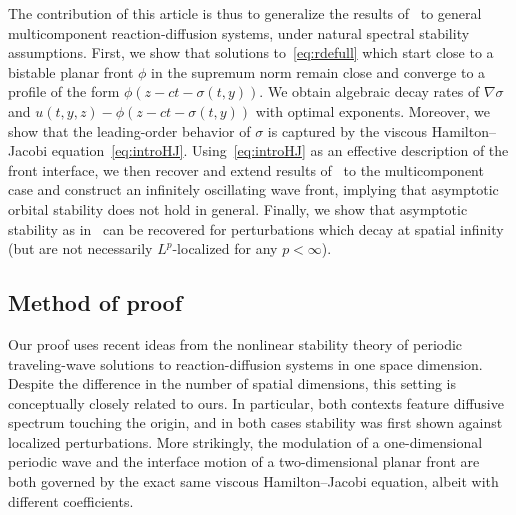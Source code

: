 \documentclass[12pt,oneside,a4paper,reqno]{amsart}
\numberwithin{equation}{section}
\theoremstyle{definition}
\theoremstyle{remark}
\begin{document}
The contribution of this article is thus to generalize the results of~\cite{matano_stability_2009,matano_large_2011,Roquejoffre_nontrivial_2009} to general multicomponent reaction-diffusion systems, under natural spectral stability assumptions. First, we show that solutions to~\eqref{eq:rdefull} which start close to a bistable planar front $\phi$ in the supremum norm remain close and converge to a profile of the form $\phi(z - ct - \sigma(t,y))$. We obtain algebraic decay rates of $\nabla \sigma$ and $u(t,y,z) - \phi(z - ct - \sigma(t,y))$ with optimal exponents. Moreover, we show that the leading-order behavior of $\sigma$ is captured by the viscous Hamilton--Jacobi equation~\eqref{eq:introHJ}.
Using~\eqref{eq:introHJ} as an effective description of the front interface, we then recover and extend results of~\cite{matano_stability_2009} to the multicomponent case and construct an infinitely oscillating wave front, implying that asymptotic orbital stability does not hold in general. Finally, we show that asymptotic stability as in~\cite{kapitula_multidimensional_1997} can be recovered for perturbations which decay at spatial infinity (but are not necessarily $L^p$-localized for any $p < \infty$).

\subsection{Method of proof}

Our proof uses recent ideas from the nonlinear stability theory of periodic traveling-wave solutions to reaction-diffusion systems in one space dimension.
Despite the difference in the number of spatial dimensions, this setting is conceptually closely related to ours. In particular, both contexts feature diffusive spectrum touching the origin, and in both cases stability was first shown against localized perturbations. More strikingly, the modulation of a one-dimensional periodic wave and the interface motion of a two-dimensional planar front are both governed by the exact same viscous Hamilton--Jacobi equation, albeit with different coefficients.
\end{document}
